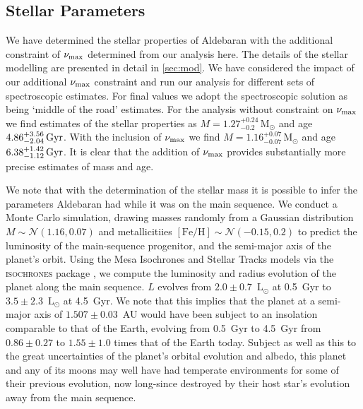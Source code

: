 \documentclass[modern]{aastex61}
\newcommand{\numax}{\mbox{$\nu_{\rm max}$}\xspace}
\newcommand{\lsun}{\mbox{$\mathrm{L}_{\odot}$}\xspace}
\begin{document}
\subsection{Stellar Parameters}

We have determined the stellar properties of Aldebaran with the additional constraint of \numax determined from our analysis here.  The details of the stellar modelling are presented in detail in \ref{sec:mod}.  We have considered the impact of our additional \numax constraint and run our analysis for different sets of spectroscopic estimates.  For final values we adopt the \citet{2012Sheffield} spectroscopic solution as being `middle of the road' estimates.  For the analysis without constraint on \numax we find estimates of the stellar properties as $M = 1.27^{+0.24}_{-0.2} \, \mathrm{M_{\odot}}$ and age $4.86^{+3.56}_{-2.04} \, \rm Gyr$.  With the inclusion of \numax we find $M = 1.16^{+0.07}_{-0.07} \, \mathrm{M_{\odot}}$ and age $6.38^{+1.42}_{-1.12} \, \rm Gyr$.  It is clear that the addition of \numax provides substantially more precise estimates of mass and age.  %

We note that with the determination of the stellar mass it is possible to infer the parameters Aldebaran had while it was on the main sequence. We conduct a Monte Carlo simulation, drawing masses randomly from a Gaussian distribution $M \sim \mathcal{N}(1.16,0.07)$ and metallicitiies $[\text{Fe}/\text{H}] \sim \mathcal{N}(-0.15,0.2)$ \citep{decin2003}  to predict the luminosity of the main-sequence progenitor, and the semi-major axis of the planet's orbit.  %
Using the Mesa Isochrones and Stellar Tracks \citep[MIST:][]{mist0,mist1} models via the \textsc{isochrones} package \citep{isochrones}, we compute the luminosity and radius evolution of the planet along the main sequence. $L$ evolves from $2.0 \pm 0.7$~\lsun at 0.5~Gyr to $3.5 \pm 2.3$~\lsun at 4.5~Gyr. 
We note that this implies that the planet at a semi-major axis of $1.507 \pm 0.03$~AU would have been subject to an insolation comparable to that of the Earth, evolving from 0.5~Gyr to 4.5~Gyr from $0.86 \pm 0.27$ to $1.55 \pm 1.0$ times that of the Earth today. Subject as well as this to the great uncertainties of the planet's orbital evolution and albedo, this planet and any of its moons may well have had temperate environments for some of their previous evolution, now long-since destroyed by their host star's evolution away from the main sequence. 
\end{document}
